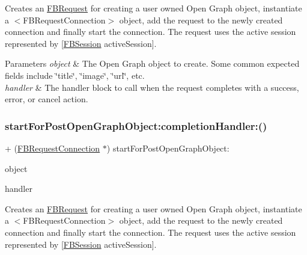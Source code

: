 Creates an {\ttfamily \hyperlink{interfaceFBRequest}{F\+B\+Request}} for creating a user owned Open Graph object, instantiate a $<$\+F\+B\+Request\+Connection$>$ object, add the request to the newly created connection and finally start the connection. The request uses the active session represented by {\ttfamily \mbox{[}\hyperlink{interfaceFBSession}{F\+B\+Session} active\+Session\mbox{]}}.


\begin{DoxyParams}{Parameters}
{\em object} & The Open Graph object to create. Some common expected fields include \char`\"{}title\char`\"{}, \char`\"{}image\char`\"{}, \char`\"{}url\char`\"{}, etc.\\
\hline
{\em handler} & The handler block to call when the request completes with a success, error, or cancel action. \\
\hline
\end{DoxyParams}
\mbox{\label{interfaceFBRequestConnection_aa592bef80bf5a2450be91fc9538b65bd}} 
\subsubsection{\texorpdfstring{start\+For\+Post\+Open\+Graph\+Object\+:completion\+Handler\+:()}{startForPostOpenGraphObject:completionHandler:()}\hspace{0.1cm}{\footnotesize\ttfamily [3/5]}}
{\footnotesize\ttfamily + (\hyperlink{interfaceFBRequestConnection}{F\+B\+Request\+Connection} $\ast$) start\+For\+Post\+Open\+Graph\+Object\+: \begin{DoxyParamCaption}\item[{(id$<$ \hyperlink{protocolFBOpenGraphObject-p}{F\+B\+Open\+Graph\+Object} $>$)}]{object }\item[{completionHandler:(F\+B\+Request\+Handler)}]{handler }\end{DoxyParamCaption}}

Creates an {\ttfamily \hyperlink{interfaceFBRequest}{F\+B\+Request}} for creating a user owned Open Graph object, instantiate a $<$\+F\+B\+Request\+Connection$>$ object, add the request to the newly created connection and finally start the connection. The request uses the active session represented by {\ttfamily \mbox{[}\hyperlink{interfaceFBSession}{F\+B\+Session} active\+Session\mbox{]}}.


